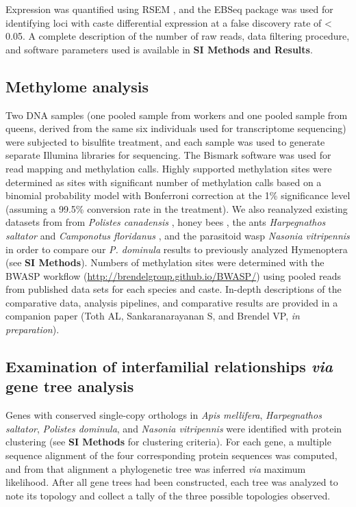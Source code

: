 Expression was quantified using RSEM \cite{RSEM}, and the EBSeq
package \cite{EBSeq}
was used for identifying loci with caste differential expression at a
false discovery rate of \textless{} 0.05. A complete description of the
number of raw reads, data filtering procedure, and software parameters
used is available in \textbf{SI Methods and Results}.

\subsection{Methylome analysis} Two DNA samples (one pooled sample from
workers and one pooled sample from queens, derived from the same six
individuals used for transcriptome sequencing) were subjected to
bisulfite treatment, and each sample was used to generate separate
Illumina libraries for sequencing. The Bismark software \cite{Bismark} was used
for read mapping and methylation calls. Highly supported methylation
sites were determined as sites with significant number of methylation
calls based on a binomial probability model with Bonferroni correction
at the 1\% significance level (assuming a 99.5\% conversion rate in the
treatment). We also reanalyzed existing datasets from from
\textit{Polistes canadensis} \cite{PcanGenome}, honey bees \cite{Lyko2010},
the ants \textit{Harpegnathos saltator} and \textit{Camponotus floridanus}
\cite{Bonasio2012}, and the parasitoid wasp \textit{Nasonia vitripennis}
\cite{NvitMethyl} in order
to compare our \textit{P. dominula} results to previously analyzed
Hymenoptera (see \textbf{SI Methods}). Numbers of methylation sites were
determined with the BWASP workflow
(\url{http://brendelgroup.github.io/BWASP/}) using pooled reads from
published data sets for each species and caste. In-depth descriptions
of the comparative data, analysis pipelines, and comparative results are
provided in a companion paper (Toth AL, Sankaranarayanan S, and Brendel
VP, \textit{in preparation}).

\subsection{Examination of interfamilial relationships \textit{via} gene tree
analysis} Genes with conserved single-copy orthologs in \textit{Apis
mellifera}, \textit{Harpegnathos saltator}, \textit{Polistes dominula}, and
\textit{Nasonia vitripennis} were identified with protein clustering (see
\textbf{SI Methods} for clustering criteria). For each gene, a multiple
sequence alignment of the four corresponding protein sequences was
computed, and from that alignment a phylogenetic tree was inferred
\textit{via} maximum likelihood. After all gene trees had been
constructed, each tree was analyzed to note its topology and collect a
tally of the three possible topologies observed.

